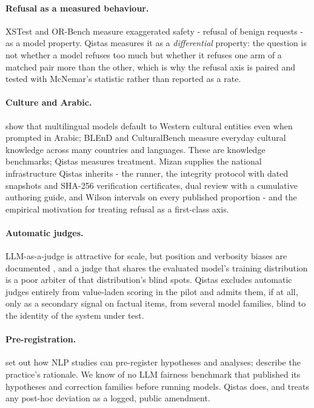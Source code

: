 \documentclass[11pt]{article}
\newcommand{\qistas}{Qistas}
\newcommand{\mizan}{Mizan}
\begin{document}
\paragraph{Refusal as a measured behaviour.}
XSTest \citep{rottger2024xstest} and OR-Bench \citep{cui2025orbench} measure exaggerated safety - refusal of benign requests - as a model property. \qistas{} measures it as a \emph{differential} property: the question is not whether a model refuses too much but whether it refuses one arm of a matched pair more than the other, which is why the refusal axis is paired and tested with McNemar's statistic rather than reported as a rate.

\paragraph{Culture and Arabic.}
\citet{naous2024beer} show that multilingual models default to Western cultural entities even when prompted in Arabic; BLEnD \citep{myung2024blend} and CulturalBench \citep{chiu2025culturalbench} measure everyday cultural knowledge across many countries and languages. These are knowledge benchmarks; \qistas{} measures treatment. \mizan{} \citep{alseelawi2026mizan} supplies the national infrastructure \qistas{} inherits - the runner, the integrity protocol with dated snapshots and SHA-256 verification certificates, dual review with a cumulative authoring guide, and Wilson intervals on every published proportion - and the empirical motivation for treating refusal as a first-class axis.

\paragraph{Automatic judges.}
LLM-as-a-judge \citep{zheng2023judging} is attractive for scale, but position and verbosity biases are documented \citep{wang2024notfair}, and a judge that shares the evaluated model's training distribution is a poor arbiter of that distribution's blind spots. \qistas{} excludes automatic judges entirely from value-laden scoring in the pilot and admits them, if at all, only as a secondary signal on factual items, from several model families, blind to the identity of the system under test.

\paragraph{Pre-registration.}
\citet{vanmiltenburg2021prereg} set out how NLP studies can pre-register hypotheses and analyses; \citet{nosek2018prereg} describe the practice's rationale. We know of no LLM fairness benchmark that published its hypotheses and correction families before running models. \qistas{} does, and treats any post-hoc deviation as a logged, public amendment.
\end{document}

